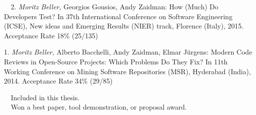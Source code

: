 \begin{etaremune}
{\item[\faFileTextO~~2.] \emph{Moritz Beller,} Georgios Gousios, Andy Zaidman: How (Much) Do
  Developers Test? In 37th International Conference on Software Engineering (ICSE), New ideas and
  Emerging Results (NIER) track, Florence (Italy), 2015. Acceptance Rate 18\% (25/135)

\item[1.] \emph{Moritz Beller,} Alberto Bacchelli, Andy Zaidman, Elmar Jürgens:
  Modern Code Reviews in Open-Source Projects: Which Problems Do They Fix? In 11th Working
  Conference on Mining Software Repositories (MSR), Hyderabad (India), 2014. Acceptance Rate 34\% (29/85)

}\end{etaremune}

\vspace{0.5cm}
\noindent
\faFileTextO~~Included in this thesis.\\
\faTrophy~~Won a best paper, tool demonstration, or proposal award.
